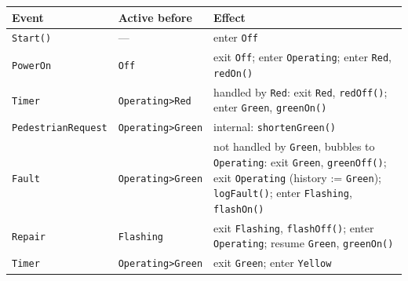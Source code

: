 \documentclass[11pt,a4paper,openany]{report}
\newcommand{\code}[1]{\texttt{#1}}
\begin{document}
\begin{center}
\small
\begin{tabularx}{\linewidth}{@{}llX@{}}
\toprule
\textbf{Event} & \textbf{Active before} & \textbf{Effect} \\
\midrule
\code{Start()}            & ---                  & enter \code{Off} \\
\code{PowerOn}            & \code{Off}           & exit \code{Off}; enter \code{Operating}; enter \code{Red}, \code{redOn()} \\
\code{Timer}              & \code{Operating>Red} & handled by \code{Red}: exit \code{Red}, \code{redOff()}; enter \code{Green}, \code{greenOn()} \\
\code{PedestrianRequest}  & \code{Operating>Green} & internal: \code{shortenGreen()} \\
\code{Fault}              & \code{Operating>Green} & not handled by \code{Green}, bubbles to \code{Operating}: exit \code{Green}, \code{greenOff()}; exit \code{Operating} (history := \code{Green}); \code{logFault()}; enter \code{Flashing}, \code{flashOn()} \\
\code{Repair}             & \code{Flashing}      & exit \code{Flashing}, \code{flashOff()}; enter \code{Operating}; resume \code{Green}, \code{greenOn()} \\
\code{Timer}              & \code{Operating>Green} & exit \code{Green}; enter \code{Yellow} \\
\bottomrule
\end{tabularx}
\end{center}
\end{document}
